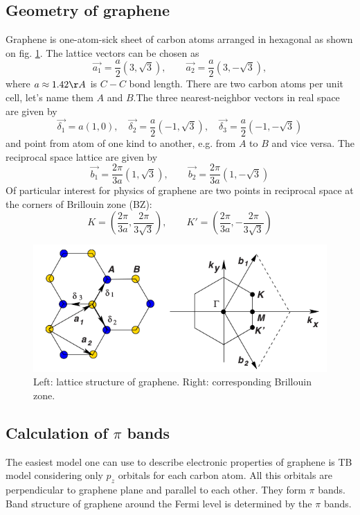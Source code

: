 \subsection{Geometry of graphene}
Graphene is one-atom-sick sheet of carbon atoms arranged in hexagonal as shown on fig. \ref{fig:graphene_lattice}. The lattice vectors can be chosen as 
\begin{equation}
	\vec{a_1} = \frac{a}{2} (3, \sqrt{3}), \qquad \vec{a_2} = \frac{a}{2} (3, - \sqrt{3}),
\end{equation}
where $a \approx 1.42 \AA$ is $C-C$ bond length. There are two carbon atoms per unit cell, let's name them $A$ and $B$.The three nearest-neighbor vectors in real space are given by 
\begin{equation}
	\vec{\delta_1} = a (1, 0), \quad \vec{\delta_2} = \frac{a}{2} (-1, \sqrt{3}), \quad \vec{\delta_3} = \frac{a}{2} (-1, -\sqrt{3})
\end{equation}
and point from atom of one kind to another, e.g. from $A$ to $B$ and vice versa.
The reciprocal space lattice are given by
\begin{equation}
	\vec{b_1} = \frac{2 \pi}{3 a}(1, \sqrt{3}), \qquad \vec{b_2} = \frac{2 \pi}{3 a} (1, -\sqrt{3})
\end{equation}
Of particular interest for physics of graphene are two points in reciprocal space at the corners of Brillouin zone (BZ):
\begin{equation}
	K = (\frac{2 \pi}{3 a}, \frac{2 \pi}{3 \sqrt{3}}), \qquad K' = (\frac{2 \pi}{3 a}, -\frac{2 \pi}{3 \sqrt{3}})
\end{equation}

\begin{figure}[ht] \label{fig:graphene_lattice}
\begin{center}
  \includegraphics[width=0.55\linewidth]{img/graphene_lattice}
  \caption{Left: lattice structure of graphene. Right: corresponding Brillouin zone.}
\end{center}
\end{figure}

\subsection{Calculation of $\pi$ bands}
The easiest model one can use to describe electronic properties of graphene is TB model considering only $p_z$ orbitals for each carbon atom. All this orbitals are perpendicular to graphene plane and parallel to each other. They form $\pi$ bands. Band structure of graphene around the Fermi level is determined by the $\pi$ bands. 

